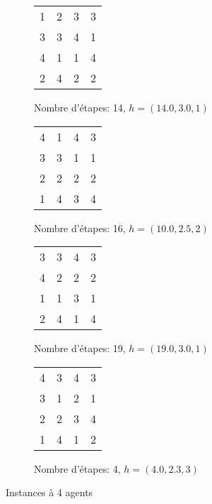 \documentclass[a4paper, 10pt]{article}
\newcommand{\bb}[1]{\colorbox{blue!30}{#1}}
\begin{document}
\begin{figure}[h]
\centering
\begin{subfigure}[h]{0.45\textwidth}
	\centering
	\begin{tabular}{|c c c c|}
		\hline
		1 & \bb{2} & 3 & 3 \\
		\bb{3} & 3 & \bb{4} & \bb{1} \\
		4 & 1 & 1 & 4 \\
		2 & 4 & 2 & 2 \\
		\hline
	\end{tabular}
	\caption{Nombre d'étapes: 14, $h = (14.0, 3.0, 1)$}
\end{subfigure}
\begin{subfigure}[h]{0.45\textwidth}
	\centering
	\begin{tabular}{|c c c c|}
		\hline
		4 & \bb{1} & \bb{4} & 3 \\
		\bb{3} & 3 & 1 & 1 \\
		2 & 2 & 2 & \bb{2} \\
		1 & 4 & 3 & 4 \\
		\hline
	\end{tabular}
	\caption{Nombre d'étapes: 16, $h = (10.0, 2.5, 2)$}
\end{subfigure}
\begin{subfigure}[h]{0.45\textwidth}
	\centering
	\begin{tabular}{|c c c c|}
		\hline
		3 & 3 & \bb{4} & \bb{3} \\
		4 & \bb{2} & 2 & 2 \\
		\bb{1} & 1 & 3 & 1 \\
		2 & 4 & 1 & 4 \\
		\hline
	\end{tabular}
	\caption{Nombre d'étapes: 19, $h = (19.0, 3.0, 1)$}
\end{subfigure}
\begin{subfigure}[h]{0.45\textwidth}
	\centering
	\begin{tabular}{|c c c c|}
		\hline
		\bb{4} & \bb{3} & 4 & 3 \\
		3 & 1 & \bb{2} & \bb{1} \\
		2 & 2 & 3 & 4 \\
		1 & 4 & 1 & 2 \\
		\hline
	\end{tabular}
	\caption{Nombre d'étapes: 4, $h = (4.0, 2.3, 3)$}
\end{subfigure}
\caption{Instances à 4 agents}
\end{figure}
\end{document}
